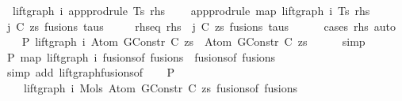 \begin{isabellebody}
\ \ {\isachardoublequoteopen}lift{\isacharunderscore}{\kern0pt}graph\ i\ {\isacharparenleft}{\kern0pt}app{\isacharunderscore}{\kern0pt}prodrule\ Ts\ rhs{\isacharparenright}{\kern0pt}\ {\isacharequal}{\kern0pt}\isanewline
\ \ \ app{\isacharunderscore}{\kern0pt}prodrule\ {\isacharparenleft}{\kern0pt}map\ {\isacharparenleft}{\kern0pt}lift{\isacharunderscore}{\kern0pt}graph\ i{\isacharparenright}{\kern0pt}\ Ts{\isacharparenright}{\kern0pt}\ rhs{\isachardoublequoteclose}\isanewline
%
\isadelimproof
%
\endisadelimproof
%
\isatagproof
{}\isamarkupfalse%
\ {\isacharminus}{\kern0pt}\isanewline
\ \ \isamarkupfalse%
\ j\ C\ zs\ fusions\ taus\isanewline
\ \ \ \ \ rhs{\isacharunderscore}{\kern0pt}eq{\isacharcolon}{\kern0pt}\ {\isachardoublequoteopen}rhs\ {\isacharequal}{\kern0pt}\ {\isacharparenleft}{\kern0pt}j{\isacharcomma}{\kern0pt}\ {\isacharparenleft}{\kern0pt}C{\isacharcomma}{\kern0pt}\ zs{\isacharparenright}{\kern0pt}{\isacharcomma}{\kern0pt}\ fusions{\isacharcomma}{\kern0pt}\ taus{\isacharparenright}{\kern0pt}{\isachardoublequoteclose}\isanewline
\ \ \ \ \isamarkupfalse%
\ {\isacharparenleft}{\kern0pt}cases\ rhs{\isacharparenright}{\kern0pt}\ auto\isanewline
\isanewline
\ \ \isamarkupfalse%
\ P{}{\isacharcolon}{\kern0pt}\ {\isachardoublequoteopen}lift{\isacharunderscore}{\kern0pt}graph\ i\ {\isacharparenleft}{\kern0pt}Atom\ {\isacharparenleft}{\kern0pt}GConstr\ C{\isacharparenright}{\kern0pt}\ zs{\isacharparenright}{\kern0pt}\ {\isacharequal}{\kern0pt}\ Atom\ {\isacharparenleft}{\kern0pt}GConstr\ C{\isacharparenright}{\kern0pt}\ zs{\isachardoublequoteclose}\isanewline
\ \ \ \ \isamarkupfalse%
\ simp\isanewline
\isanewline
\ \ \isamarkupfalse%
\ P{}{\isacharcolon}{\kern0pt}\ {\isachardoublequoteopen}map\ {\isacharparenleft}{\kern0pt}lift{\isacharunderscore}{\kern0pt}graph\ i{\isacharparenright}{\kern0pt}\ {\isacharparenleft}{\kern0pt}fusions{\isacharunderscore}{\kern0pt}of\ fusions{\isacharparenright}{\kern0pt}\ {\isacharequal}{\kern0pt}\ fusions{\isacharunderscore}{\kern0pt}of\ fusions{\isachardoublequoteclose}\isanewline
\ \ \ \ \isamarkupfalse%
\ {\isacharparenleft}{\kern0pt}simp\ add{\isacharcolon}{\kern0pt}\ lift{\isacharunderscore}{\kern0pt}graph{\isacharunderscore}{\kern0pt}fusions{\isacharunderscore}{\kern0pt}of{\isacharparenright}{\kern0pt}\isanewline
\isanewline
\ \ \isamarkupfalse%
\ P{}{\isacharcolon}{\kern0pt}\isanewline
\ \ \ \ {\isachardoublequoteopen}lift{\isacharunderscore}{\kern0pt}graph\ i\ {\isacharparenleft}{\kern0pt}Mols{}\ {\isacharparenleft}{\kern0pt}Atom\ {\isacharparenleft}{\kern0pt}GConstr\ C{\isacharparenright}{\kern0pt}\ zs{\isacharparenright}{\kern0pt}\ {\isacharparenleft}{\kern0pt}fusions{\isacharunderscore}{\kern0pt}of\ fusions{\isacharparenright}{\kern0pt}{\isacharparenright}{\kern0pt}\ {\isacharequal}{\kern0pt}\isanewline

\end{isabellebody}
